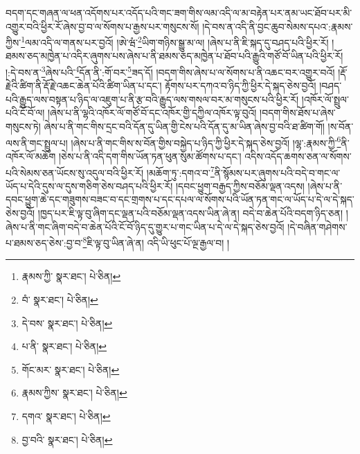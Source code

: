 བདག་དང་གཞན་ལ་ཕན་འདོགས་པར་འདོད་པའི་གང་ཟག་གིས་ལམ་འདི་ལ་མ་བརྟེན་པར་ནམ་ཡང་ཐོབ་པར་མི་འགྱུར་བའི་ཕྱིར་རོ་ཞེས་བྱ་བ་ལ་སོགས་པ་རྒྱས་པར་གསུངས་སོ། །དེ་བས་ན་འདི་ནི་བྱང་ཆུབ་སེམས་དཔའ་:རྣམས་ཀྱིས་\footnote{རྣམས་ཀྱི་  སྣར་ཐང་།  པེ་ཅིན། }ལམ་འདི་ལ་གནས་པར་བྱའོ། །ཨེ་ཝཾ་\footnote{བཾ་  སྣར་ཐང་།  པེ་ཅིན། }ཡིག་གཉིས་སྒྱུ་མ་ལ། །ཞེས་པ་ནི་ཇི་སྐད་དུ་བཤད་པའི་ཕྱིར་རོ། །ཐམས་ཅད་མཁྱེན་པ་འདིར་ཞུགས་པས་ཞེས་པ་ནི་ཐམས་ཅད་མཁྱེན་པ་ཐོབ་པའི་རྒྱུའི་གཙོ་བོ་ཡིན་པའི་ཕྱིར་རོ། །:དེ་བས་ན་\footnote{དེ་བས་  སྣར་ཐང་།  པེ་ཅིན། }ཞེས་པའི་\footnote{པ་ནི་  སྣར་ཐང་།  པེ་ཅིན། }དོན་ནི་:གོ་བར་\footnote{གོང་མར་  སྣར་ཐང་།  པེ་ཅིན། }ཟད་དོ། །བདག་གིས་ཞེས་པ་ལ་སོགས་པ་ནི་འཆང་བར་འགྱུར་བའོ། །རྡོ་རྗེའི་ཚིག་ནི་རྡོ་རྗེ་འཆང་ཆེན་པོའི་ཚིག་ཡིན་པ་དང་། རྟོགས་པར་དཀའ་བ་ཉིད་ཀྱི་ཕྱིར་དེ་སྐད་ཅེས་བྱའོ། །བཤད་པའི་རྒྱུད་ལས་བསྟན་པ་ཉིད་ལ་འཇུག་པ་ནི་རྩ་བའི་རྒྱུད་ལས་གསལ་བར་མ་གསུངས་པའི་ཕྱིར་རོ། །འཁོར་ལོ་སྤྲུལ་པའི་ངོ་བོ་ལ། །ཞེས་པ་ནི་ལྷའི་འཁོར་ལོ་གཙོ་བོ་དང་འཁོར་གྱི་དཀྱིལ་འཁོར་ལྟ་བུའོ། །བདག་གིས་ཐོས་པ་ཞེས་གསུངས་ཏེ། ཞེས་པ་ནི་གང་གིས་དྲང་བའི་དོན་དུ་ཡིན་གྱི་ངེས་པའི་དོན་དུ་མ་ཡིན་ཞེས་བྱ་བའི་ཐ་ཚིག་གོ། །ས་བོན་ལས་ནི་གང་སྤྲུལ་པ། །ཞེས་པ་ནི་གང་གིས་ས་བོན་གྱིས་བསྐྱེད་པ་ཉིད་ཀྱི་ཕྱིར་དེ་སྐད་ཅེས་བྱའོ། །ལྷ་:རྣམས་ཀྱི་\footnote{རྣམས་ཀྱིས་  སྣར་ཐང་།  པེ་ཅིན། }ནི་འཁོར་ལོ་མཆོག །ཅེས་པ་ནི་འདི་དག་གིས་ཡོན་ཏན་ཕུན་སུམ་ཚོགས་པ་དང་། འདིས་འདོད་ཆགས་ཅན་ལ་སོགས་པའི་སེམས་ཅན་ཡོངས་སུ་འདུལ་བའི་ཕྱིར་རོ། །མཆོག་ཏུ་:དགའ་བ་\footnote{དགའ་  སྣར་ཐང་།  པེ་ཅིན། }ནི་སྙོམས་པར་ཞུགས་པའི་བདེ་བ་གང་ལ་ཡོད་པ་དེའི་དུས་ལ་དུས་གཅིག་ཅེས་བཤད་པའི་ཕྱིར་རོ། །དབང་ཕྱུག་བརྒྱད་ཀྱིས་བཅོམ་ལྡན་འདས། །ཞེས་པ་ནི་དབང་ཕྱུག་ཆེ་དང་གཟུགས་བཟང་བ་དང་གྲགས་པ་དང་དཔལ་ལ་སོགས་པའི་ཡོན་ཏན་གང་ལ་ཡོད་པ་དེ་ལ་དེ་སྐད་ཅེས་བྱའོ། །ཁྱད་པར་ཇི་ལྟ་བུ་ཞིག་དང་ལྡན་པའི་བཅོམ་ལྡན་འདས་ཡིན་ཞེ་ན། བདེ་བ་ཆེན་པོའི་བདག་ཉིད་ཅན། །ཞེས་པ་ནི་གང་ཞིག་བདེ་བ་ཆེན་པོའི་ངོ་བོ་ཉིད་དུ་གྱུར་པ་གང་ཡིན་པ་དེ་ལ་དེ་སྐད་ཅེས་བྱའོ། །དེ་བཞིན་གཤེགས་པ་ཐམས་ཅད་ཅེས་:བྱ་བ་\footnote{བྱ་བའི་  སྣར་ཐང་།  པེ་ཅིན། }ཇི་ལྟ་བུ་ཡིན་ཞེ་ན། འདི་ཡི་ཕུང་པོ་ལྔ་རྒྱལ་བ། །
